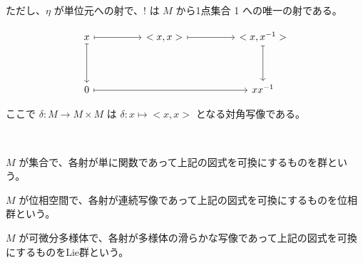 \documentclass[uplatex,a4j,12pt,dvipdfmx]{jsarticle}
\begin{document}
ただし、$\eta$ が単位元への射で、$!$ は $M$ から1点集合 1 への唯一の射である。

\[
	\begin{tikzcd}
		x \arrow[dd, maps to] \arrow[rr, maps to] &  & {<x,x>} \arrow[rr, maps to] &  & {<x,x^{-1}>} \arrow[dd, maps to] \\
		&  &                             &  &                                  \\
		0 \arrow[rrrr, maps to]                   &  &                             &  & xx^{-1}
	\end{tikzcd}
\]

ここで $\delta : M \to M \times M$ は $\delta : x \mapsto <x,x> $ となる対角写像である。

\ \

$M$ が集合で、各射が単に関数であって上記の図式を可換にするものを群という。

$M$ が位相空間で、各射が連続写像であって上記の図式を可換にするものを位相群という。

$M$ が可微分多様体で、各射が多様体の滑らかな写像であって上記の図式を可換にするものをLie群という。
\end{document}
